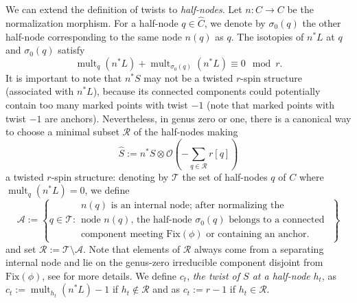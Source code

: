 \documentclass[11pt]{amsart}
\theoremstyle{definition}
\theoremstyle{remark}
\newcommand{\<}{\left<}
\renewcommand{\>}{\right>}
\numberwithin{equation}{section}
\begin{document}
We can extend the definition of twists to \textit{half-nodes}. Let $n: \widehat{C} \to C$ be the normalization morphism. For a half-node $q\in \widehat{C}$, we denote by $\sigma_0(q)$ the other half-node corresponding to the same node $n(q)$ as $q$. The isotopies of $n^*L$ at $q$ and $\sigma_0(q)$ satisfy $$\operatorname{mult}_{q}(n^*L)+\operatorname{mult}_{\sigma_0(q)}(n^*L)\equiv0 \mod r.$$ It is important to note that $n^*S$ may not be a twisted $r$-spin structure (associated with %
$n^*L$), because %
its connected components could potentially contain too many marked points with twist $-1$ (note that marked points with twist $-1$ are anchors).  Nevertheless, in genus zero or one, there is a canonical way to choose a minimal subset $\mathcal{R}$ of the half-nodes making
\begin{equation}
\label{eq normalize S}
\widehat{S}:= n^* S \otimes {\mathcal{O}}\left(-\sum_{q \in \mathcal{R}} r [q]\right)
\end{equation}
a twisted $r$-spin %
structure: denoting by %
$\mathcal T$ the set of half-nodes $q$ of $C$ where $\operatorname{mult}_{q}(n^*L)=0$, we %
define
\begin{equation*}
\mathcal A:= \left\{q \in \mathcal T\colon 
\begin{array}{ccc}
    \text{$n(q)$ is an internal node; after normalizing the }\\
    \text{node $n(q)$, the half-node $\sigma_0(q)$ belongs to a connected }\\
    \text{component meeting $\text{Fix}(\phi)$ or containing an anchor.}
\end{array} \right\}
\end{equation*}
and %
set $\mathcal R := \mathcal T \setminus \mathcal A$. Note that elements of $\mathcal R$ always come from a separating internal node and lie on the genus-zero irreducible component disjoint %
from $\text{Fix}(\phi)$, see %
\cite[\S 2.3]{BCT1} for more details. 
We define $c_t$, \textit{the twist of $S$ at a half-node} $h_t$, as $c_t:=\operatorname{mult}_{h_t}(n^*L)-1$ if $h_t \notin \mathcal R$ and as $c_t:=r-1$ if $h_t\in \mathcal R$.
\end{document}
